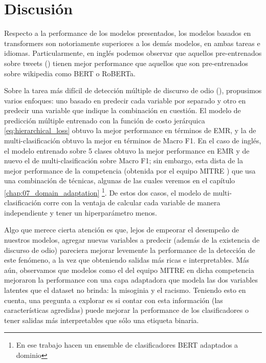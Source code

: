 \section{Discusión}
\label{sec:04_discussion}

Respecto a la performance de los modelos presentados, los modelos basados en transformers son notoriamente superiores a los demás modelos, en ambas tareas e idiomas. Particularmente, en inglés podemos observar que aquellos pre-entrenados sobre tweets (\bertweet{}) tienen mejor performance que aquellos que son pre-entrenados sobre wikipedia como BERT o RoBERTa.

Sobre la tarea más difícil de detección múltiple de discurso de odio (\subtaskb{}), propusimos varios enfoques: uno basado en predecir cada variable por separado y otro en predecir una variable que indique la combinación en cuestión. El modelo de predicción múltiple entrenado con la función de costo jerárquica \ref{eq:hierarchical_loss} obtuvo la mejor performance en términos de EMR, y la de multi-clasificación obtuvo la mejor en términos de Macro F1. En el caso de inglés, el modelo entrenado sobre 5 clases obtuvo la mejor performance en EMR y de nuevo el de multi-clasificación sobre Macro F1; sin embargo, esta dista de la mejor performance de la competencia (obtenida por el equipo MITRE \cite{gertner-etal-2019-mitre}) que usa una combinación de técnicas, algunas de las cuales veremos en el capítulo \ref{chap:07_domain_adaptation} \footnote{En ese trabajo hacen un ensemble de clasificadores BERT adaptados a dominio}. De estos dos casos, el modelo de multi-clasificación corre con la ventaja de calcular cada variable de manera independiente y tener un hiperparámetro menos.

Algo que merece cierta atención es que, lejos de empeorar el desempeño de nuestros modelos, agregar nuevas variables a predecir (además de la existencia de discurso de odio) pareciera mejorar levemente la performance de la detección de este fenómeno, a la vez que obteniendo salidas más ricas e interpretables. Más aún, observamos que modelos como el del equipo MITRE \cite{gertner-etal-2019-mitre} en dicha competencia mejoraron la performance con una capa adaptadora que modela las dos variables latentes que el dataset no brinda: la misoginia y el racismo. Teniendo esto en cuenta, una pregunta a explorar es si contar con esta información (las características agredidas) puede mejorar la performance de los clasificadores o tener salidas más interpretables que sólo una etiqueta binaria.

